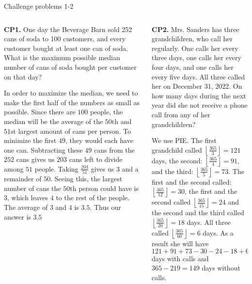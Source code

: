 \documentclass[9pt,aspectratio=169]{beamer}
\begin{document}
\begin{frame}{Challenge problems 1-2}
  \begin{columns}[T]
    \begin{column}{0.5\textwidth}
      \begin{problem}
        \textbf{CP1.} One day the Beverage Barn sold 252 cans of soda to 100 customers, and every customer bought at least one can of soda. What is the maximum possible median number of cans of soda bought per customer on that day?
      \end{problem}
      In order to maximize the median, we need to make the first half of the numbers as small as possible. Since there are $100$ people, the median will be the average of the $50\text{th}$ and $51\text{st}$ largest amount of cans per person. To minimize the first $49$, they would each have one can. Subtracting these $49$ cans from the $252$ cans gives us $203$ cans left to divide among $51$ people. Taking $\frac{203}{51}$ gives us $3$ and a remainder of $50$. Seeing this, the largest number of cans the $50$th person could have is $3$, which leaves $4$ to the rest of the people. The average of $3$ and $4$ is $3.5$. Thus our answer is $\boxed{3.5}$
    \end{column}
    \begin{column}{0.5\textwidth}
      \begin{problem}
        \textbf{CP2.} Mrs. Sanders has three grandchildren, who call her regularly. One calls her every three days, one calls her every four days, and one calls her every five days. All three called her on December 31, 2022. On how many days during the next year did she not receive a phone call from any of her grandchildren?
      \end{problem}
      We use PIE. The first grandchild called $\left\lfloor\frac{365}{3}\right\rfloor = 121$ days, the second: $\left\lfloor\frac{365}{4}\right\rfloor = 91$, and the third: $\left\lfloor\frac{365}{5}\right\rfloor = 73$. The first and the second called: $\left\lfloor\frac{365}{12}\right\rfloor = 30$, the first and the second called $\left\lfloor\frac{365}{15}\right\rfloor = 24$ and the second and the third called $\left\lfloor\frac{365}{20}\right\rfloor = 18$ days. All three called $\left\lfloor\frac{365}{60}\right\rfloor = 6$ days. As a result she will have $121 + 91 + 73 - 30 - 24 - 18 + 6 = 219$ days with calls and $365 - 219 = \boxed{149}$ days without calls.
    \end{column}
  \end{columns}
\end{frame}
\end{document}

